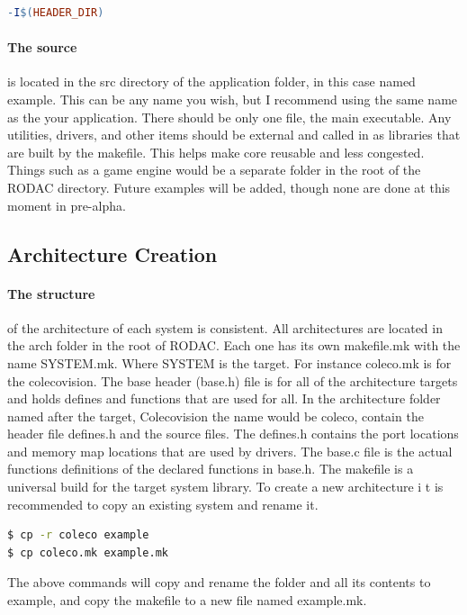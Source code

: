 \documentclass{article}
\begin{document}
  \begin{lstlisting}[language=make]
-I$(HEADER_DIR)
  \end{lstlisting}

  \paragraph{The source}is located in the src directory of the application folder, in this case named example. This can be any name you wish, but I recommend using the same name as the your application.
  There should be only one file, the main executable. Any utilities, drivers, and other items should be external and called in as libraries that are built by the makefile. This helps make core reusable
  and less congested. Things such as a game engine would be a separate folder in the root of the RODAC directory. Future examples will be added, though none are done at this moment in pre-alpha.

  \subsection{Architecture Creation}

  \paragraph{The structure}of the architecture of each system is consistent. All architectures are located in the arch folder in the root of RODAC.
  Each one has its own makefile.mk with the name SYSTEM.mk. Where SYSTEM is the target. For instance coleco.mk is for the colecovision. The base header (base.h)
  file is for all of the architecture targets and holds defines and functions that are used for all. In the architecture folder named after the target, Colecovision the name would be coleco,
  contain the header file defines.h and the source files. The defines.h contains the port locations and memory map locations that are used by drivers. The base.c file
  is the actual functions definitions of the declared functions in base.h. The makefile is a universal build for the target system library. To create a new architecture i
  t is recommended to copy an existing system and rename it.
  \begin{lstlisting}[language=bash]
$ cp -r coleco example
$ cp coleco.mk example.mk
  \end{lstlisting}
  The above commands will copy and rename the folder and all its contents to example, and copy the makefile to a new file named example.mk.
\end{document}
